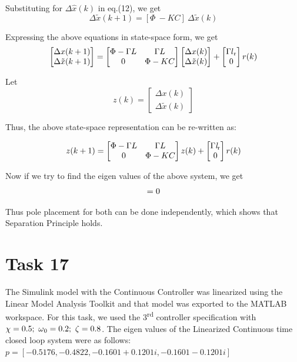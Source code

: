 \documentclass[a4paper,12pt,oneside,onecolumn]{article} %
\begin{document}
Substituting for $\Delta \hat{x}(k)$ in eq.(12), we get 
\begin{equation}
\Delta \tilde{x}(k+1) = [\Phi \ - K C] \ \Delta \tilde{x}(k)
\end{equation}

Expressing the above equations in state-space form, we get
\[
\begin{bmatrix}
  \Delta x(k+1) \\
 \Delta \tilde{x}(k+1)
\end{bmatrix}
=
\begin{bmatrix}
  \Phi - \Gamma L &  \Gamma L \\
  0 & \Phi - KC
\end{bmatrix}
\begin{bmatrix}
  \Delta x(k) \\
 \Delta \tilde{x}(k)
\end{bmatrix}
+
\begin{bmatrix}
\Gamma l\textsubscript{r} \\
0
\end{bmatrix}
r(k)
\]

Let 
\[
z(k) = 
\begin{bmatrix}
  \Delta x(k) \\
 \Delta \tilde{x}(k)
\end{bmatrix}
\]

Thus, the above state-space representation can be re-written as:

\[
z(k+1) = 
\begin{bmatrix}
  \Phi - \Gamma L &  \Gamma L \\
  0 & \Phi - KC
\end{bmatrix}
z(k) +
\begin{bmatrix}
 \Gamma \textit l\textsubscript{r}\\
  0
\end{bmatrix}
r(k)
\]

Now if we try to find the eigen values of the above system, we get 
\begin{equation}
[sI - (\Phi - \Gamma L)] [sI - (\Phi - KC)] = 0 \\
\end{equation}

Thus pole placement for both can be done independently, which shows that Separation Principle holds.

\section*{Task 17}
The Simulink model with the Continuous Controller was linearized using the Linear Model Analysis Toolkit and that model was exported to the MATLAB workspace. For this task, we used the 3\textsuperscript{rd} controller specification with $\chi = 0.5; \ \omega \textsubscript{0} = 0.2; \ \zeta =0.8$. 
The eigen values of the Linearized Continuous time closed loop system were as follows: \\
$p = [-0.5176, -0.4822, -0.1601+0.1201i, -0.1601-0.1201i ]$ 
\end{document}
